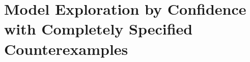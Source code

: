
\chapter[Model Exploration by Confidence]{Model Exploration by Confidence with Completely Specified Counterexamples}
\label{cha:model-expl-conf}


